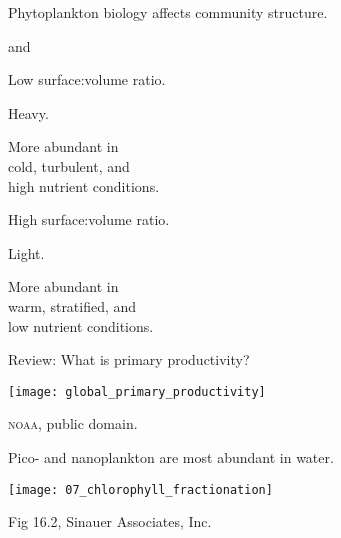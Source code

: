 \documentclass[t,handout]{beamer}  %
\begin{document}
%
\begin{frame}[t]{Phytoplankton biology affects community structure.}

\begin{multicols}{2}

		\hangpara {} and 

		\hangpara Low surface:volume ratio.
		
		\hangpara Heavy.

		\hangpara More abundant in \\
		\hspace*{1em}cold, turbulent, and \\
		\hspace*{1em}high nutrient conditions.
		
\columnbreak

		\hangpara {}

		\hangpara High surface:volume ratio.

		\hangpara Light.
		
		\hangpara More abundant in \\
		\hspace*{1em} warm, stratified, and \\
		\hspace*{1em} low nutrient conditions.

\end{multicols}

\end{frame}
%
\begin{frame}[t]{Review: What is primary productivity?}

\begin{center}
	
	\vspace*{0.5\baselineskip}
	
	\texttt{[image: global\_primary\_productivity]}
	
	\vfilll
	
	\hfill \tiny \textsc{noaa}, public domain.
\end{center}

\end{frame}
%
\begin{frame}[t]{Pico- and nanoplankton are most abundant in  water.}

	\vspace*{-0.5\baselineskip}
	\begin{center}
		\texttt{[image: 07\_chlorophyll\_fractionation]}
	\end{center}
	\vfilll
	
\hfill \tiny Fig 16.2, \textcopyright Sinauer Associates, Inc.
\end{frame}
\end{document}
